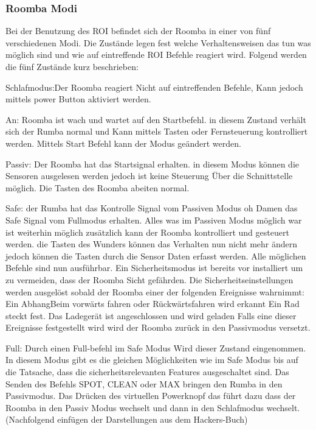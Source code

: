 \subsubsection{Roomba Modi}
Bei der Benutzung des ROI befindet sich der Roomba in einer von fünf verschiedenen Modi. Die Zustände legen fest welche Verhaltensweisen das tun was möglich sind und wie auf eintreffende ROI Befehle reagiert wird. Folgend werden die fünf Zustände kurz beschrieben:

Schlafmodus:Der Roomba reagiert Nicht auf eintreffenden Befehle, Kann jedoch mittels power Button aktiviert werden.

An: Roomba ist wach und wartet auf den Startbefehl. in diesem Zustand verhält sich der Rumba normal und Kann mittels Tasten oder Fernsteuerung kontrolliert werden. Mittels Start Befehl kann der Modus geändert werden.

Passiv: Der Roomba hat das Startsignal erhalten. in diesem Modus können die Sensoren ausgelesen werden jedoch ist keine Steuerung Über die Schnittstelle möglich. Die Tasten des Roomba abeiten normal. 

Safe: der Rumba hat das Kontrolle Signal vom Passiven Modus oh Damen das Safe Signal vom Fullmodus erhalten. Alles was im Passiven Modus möglich war ist weiterhin möglich zusätzlich kann der Roomba kontrolliert und gesteuert werden. die Tasten des Wunders können das Verhalten nun nicht mehr ändern jedoch können die Tasten durch die Sensor Daten erfasst werden. Alle möglichen Befehle sind nun ausführbar. Ein Sicherheitsmodus ist bereits vor installiert um zu vermeiden, dass der Roomba Sicht gefährden. Die Sicherheitseinstellungen werden ausgelöst sobald der Roomba einer der folgenden Ereignisse wahrnimmt:
Ein AbhangBeim vorwärts fahren oder Rückwärtsfahren wird erkannt
Ein Rad steckt fest.
Das Ladegerät ist angeschlossen und wird geladen
Falls eine dieser Ereignisse festgestellt wird wird der Roomba zurück in den Passivmodus versetzt. 

Full: Durch einen Full-befehl im Safe Modus Wird dieser Zustand eingenommen. In diesem Modus gibt es die gleichen  Möglichkeiten wie im Safe Modus bis auf die Tatsache, dass die sicherheitsrelevanten Features ausgeschaltet sind. Das Senden des Befehls SPOT, CLEAN oder MAX bringen den Rumba in den Passivmodus. Das Drücken des virtuellen Powerknopf das führt dazu dass der Roomba in den Passiv Modus wechselt und dann in den Schlafmodus wechselt. 
(Nachfolgend einfügen der Darstellungen aus dem Hackers-Buch)


